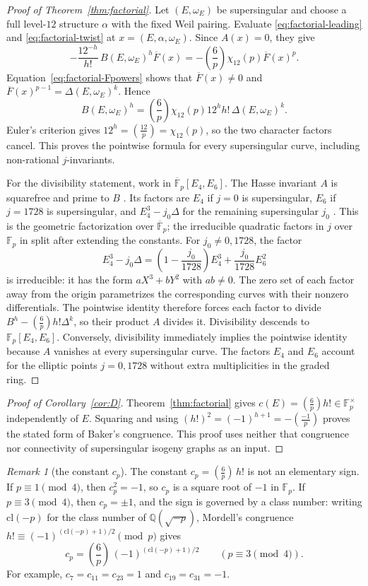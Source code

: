 \documentclass[11pt,a4paper]{article}
\numberwithin{equation}{section}
\theoremstyle{definition}
\theoremstyle{remark}
\newtheorem{remark}[theorem]{Remark}
\newcommand{\Fp}{\mathbb F_p}
\newcommand{\Fb}{\overline{\mathbb F}_p}
\newcommand{\Q}{\mathbb Q}
\newcommand{\leg}[2]{\left(\frac{#1}{#2}\right)}
\newcommand{\Lp}[1]{\left(\frac{#1}{p}\right)}
\begin{document}
\begin{proof}[Proof of Theorem~\ref{thm:factorial}]
Let $(E,\omega_E)$ be supersingular and choose a full level-$12$
structure $\alpha$ with the fixed Weil pairing. Evaluate
\eqref{eq:factorial-leading} and \eqref{eq:factorial-twist} at
$x=(E,\alpha,\omega_E)$. Since $A(x)=0$, they give
\[
-\frac{12^{-h}}{h!}\,B(E,\omega_E)^h\overline F(x)
=-\Lp6\chi_{12}(p)\overline F(x)^p.
\]
Equation~\eqref{eq:factorial-Fpowers} shows that
$\overline F(x)\ne0$ and
$\overline F(x)^{p-1}=\Delta(E,\omega_E)^k$. Hence
\[
B(E,\omega_E)^h
=\Lp6\chi_{12}(p)12^h h!\,\Delta(E,\omega_E)^k.
\]
Euler's criterion gives $12^h=\leg{12}{p}=\chi_{12}(p)$,
so the two character factors cancel. This proves the pointwise formula
for every supersingular curve, including non-rational $j$-invariants.

For the divisibility statement, work in $\Fb[E_4,E_6]$.
The Hasse invariant $A$ is squarefree and prime to $B$
\citep[\S2.3, Th\'eor\`eme~1(ii), p.~116]{Robert80}. Its factors are $E_4$ if
$j=0$ is supersingular, $E_6$ if $j=1728$ is supersingular, and
$E_4^3-j_0\Delta$ for the remaining supersingular $j_0$
\citep[\S3]{KZ98}. This is the geometric factorization over $\Fb$;
the irreducible quadratic factors in $j$ over $\Fp$ in
\citet[Theorem~1.2]{Baker98} split after extending the constants.
For $j_0\ne0,1728$, the factor
\[
E_4^3-j_0\Delta
=\left(1-\frac{j_0}{1728}\right)E_4^3
+\frac{j_0}{1728}E_6^2
\]
is irreducible: it has the form $aX^3+bY^2$ with $ab\ne0$.
The zero set of each factor away from the origin
parametrizes the corresponding curves with their nonzero differentials.
The pointwise identity therefore forces each factor to divide
$B^h-\Lp6h!\Delta^k$, so their product $A$ divides it.
Divisibility descends to $\Fp[E_4,E_6]$. Conversely, divisibility
immediately implies the pointwise identity because $A$ vanishes at every
supersingular curve. The factors $E_4$ and $E_6$ account for the elliptic
points $j=0,1728$ without extra multiplicities in the graded ring.
\end{proof}

\begin{proof}[Proof of Corollary~\ref{cor:D}]
Theorem~\ref{thm:factorial} gives $c(E)=\Lp6h!\in\Fp^\times$
independently of $E$. Squaring and using
$(h!)^2=(-1)^{h+1}=-\Lp{-1}$ proves the stated form of
Baker's congruence. This proof uses neither that congruence nor
connectivity of supersingular isogeny graphs as an input.
\end{proof}

\begin{remark}[the constant $c_p$]\label{rem:mordell}
The constant $c_p=\Lp6\,h!$ is not an elementary sign. If
$p\equiv1\pmod4$, then $c_p^2=-1$, so $c_p$ is a square root of $-1$ in
$\Fp$. If $p\equiv3\pmod4$, then $c_p=\pm1$, and the sign is governed by a
class number: writing $\mathrm{cl}(-p)$ for the class number of
$\Q(\sqrt{-p})$, Mordell's congruence
$h!\equiv(-1)^{(\mathrm{cl}(-p)+1)/2}\pmod p$ \citep{Mordell61} gives
\[
c_p=\Lp6\,(-1)^{(\mathrm{cl}(-p)+1)/2}\qquad(p\equiv3\pmod4).
\]
For example, $c_7=c_{11}=c_{23}=1$ and $c_{19}=c_{31}=-1$.
\end{remark}
\end{document}
